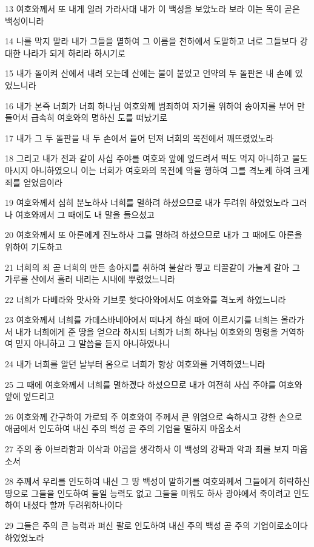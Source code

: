 \par 13 여호와께서 또 내게 일러 가라사대 내가 이 백성을 보았노라 보라 이는 목이 곧은 백성이니라
\par 14 나를 막지 말라 내가 그들을 멸하여 그 이름을 천하에서 도말하고 너로 그들보다 강대한 나라가 되게 하리라 하시기로
\par 15 내가 돌이켜 산에서 내려 오는데 산에는 불이 붙었고 언약의 두 돌판은 내 손에 있었느니라
\par 16 내가 본즉 너희가 너희 하나님 여호와께 범죄하여 자기를 위하여 송아지를 부어 만들어서 급속히 여호와의 명하신 도를 떠났기로
\par 17 내가 그 두 돌판을 내 두 손에서 들어 던져 너희의 목전에서 깨뜨렸었노라
\par 18 그리고 내가 전과 같이 사십 주야를 여호와 앞에 엎드려서 떡도 먹지 아니하고 물도 마시지 아니하였으니 이는 너희가 여호와의 목전에 악을 행하여 그를 격노케 하여 크게 죄를 얻었음이라
\par 19 여호와께서 심히 분노하사 너희를 멸하려 하셨으므로 내가 두려워 하였었노라 그러나 여호와께서 그 때에도 내 말을 들으셨고
\par 20 여호와께서 또 아론에게 진노하사 그를 멸하려 하셨으므로 내가 그 때에도 아론을 위하여 기도하고
\par 21 너희의 죄 곧 너희의 만든 송아지를 취하여 불살라 찧고 티끌같이 가늘게 갈아 그 가루를 산에서 흘러 내리는 시내에 뿌렸었느니라
\par 22 너희가 다베라와 맛사와 기브롯 핫다아와에서도 여호와를 격노케 하였느니라
\par 23 여호와께서 너희를 가데스바네아에서 떠나게 하실 때에 이르시기를 너희는 올라가서 내가 너희에게 준 땅을 얻으라 하시되 너희가 너희 하나님 여호와의 명령을 거역하여 믿지 아니하고 그 말씀을 듣지 아니하였나니
\par 24 내가 너희를 알던 날부터 옴으로 너희가 항상 여호와를 거역하였느니라
\par 25 그 때에 여호와께서 너희를 멸하겠다 하셨으므로 내가 여전히 사십 주야를 여호와 앞에 엎드리고
\par 26 여호와께 간구하여 가로되 주 여호와여 주께서 큰 위엄으로 속하시고 강한 손으로 애굽에서 인도하여 내신 주의 백성 곧 주의 기업을 멸하지 마옵소서
\par 27 주의 종 아브라함과 이삭과 야곱을 생각하사 이 백성의 강퍅과 악과 죄를 보지 마옵소서
\par 28 주께서 우리를 인도하여 내신 그 땅 백성이 말하기를 여호와께서 그들에게 허락하신 땅으로 그들을 인도하여 들일 능력도 없고 그들을 미워도 하사 광야에서 죽이려고 인도하여 내셨다 할까 두려워하나이다
\par 29 그들은 주의 큰 능력과 펴신 팔로 인도하여 내신 주의 백성 곧 주의 기업이로소이다 하였었노라

